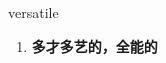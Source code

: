 
\begin{frame}
{\huge versatile}
\begin{center}
\begin{enumerate}\Large
  \item \textbf{多才多艺的，全能的}
\end{enumerate}
\end{center}
\end{frame}
